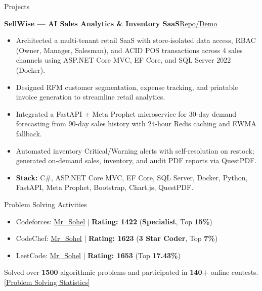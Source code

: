 \documentclass{resume}
\newcommand{\sellwiseRepo}{https://github.com/mr-sohel/SellWise}
\newcommand{\projecttitle}[2]{%
    \textbf{#1}\hfill{\footnotesize\href{#2}{Repo/Demo}}%
}
\begin{document}
\begin{rSection}{Projects}

\projecttitle{SellWise --- AI Sales Analytics \& Inventory SaaS}{\sellwiseRepo}
\vspace{2pt}
\begin{itemize}
    \item Architected a multi-tenant retail SaaS with store-isolated data access, RBAC (Owner, Manager, Salesman), and ACID POS transactions across 4 sales channels using ASP.NET Core MVC, EF Core, and SQL Server 2022 (Docker).
    \item Designed RFM customer segmentation, expense tracking, and printable invoice generation to streamline retail analytics.
    \item Integrated a FastAPI + Meta Prophet microservice for 30-day demand forecasting from 90-day sales history with 24-hour Redis caching and EWMA fallback.
    \item Automated inventory Critical/Warning alerts with self-resolution on restock; generated on-demand sales, inventory, and audit PDF reports via QuestPDF.
    \item {\bf Stack:} C\#, ASP.NET Core MVC, EF Core, SQL Server, Docker, Python, FastAPI, Meta Prophet, Bootstrap, Chart.js, QuestPDF.
\end{itemize}

\end{rSection}


\begin{rSection}{Problem Solving Activities}

\begin{itemize}
    \item Codeforces: \href{https://codeforces.com/profile/mr_sohel}{Mr\_Sohel} | {\bf Rating: 1422} ({\bf Specialist}, Top {\bf 15\%})
    \item CodeChef: \href{https://www.codechef.com/users/mr_sohel}{Mr\_Sohel} | {\bf Rating: 1623} ({\bf 3 Star Coder}, Top {\bf 7\%})
    \item LeetCode: \href{https://leetcode.com/mr_sohel/}{Mr\_Sohel} | {\bf Rating: 1653} (Top {\bf 17.43\%})
\end{itemize}

\vspace{2pt}
Solved over {\bf 1500} algorithmic problems and participated in {\bf 140+} online contests.
\href{https://codolio.com/profile/mr_sohel}{[Problem Solving Statistics]}

\end{rSection}
\end{document}
